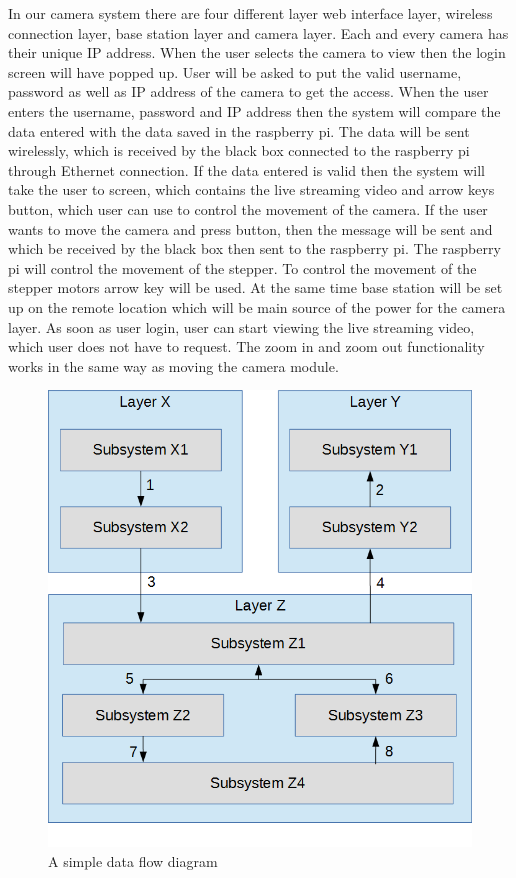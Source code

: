 In our camera system there are four different layer web interface layer, wireless connection layer, base station layer and camera layer. Each and every camera has their unique IP address. When the user selects the camera to view then the login screen will have popped up. User will be asked to put the valid username, password as well as IP address of the camera to get the access. When the user enters the username, password and IP address then the system will compare the data entered with the data saved in the raspberry pi. The data will be sent wirelessly, which is received by the black box connected to the raspberry pi through Ethernet connection. If the data entered is valid then the system will take the user to screen, which contains the live streaming video and arrow keys button, which user can use to control the movement of the camera. If the user wants to move the camera and press button, then the message will be sent and which be received by the black box then sent to the raspberry pi. The raspberry pi will control the movement of the stepper. To control the movement of the stepper motors arrow key will be used. At the same time base station will be set up on the remote location which will be main source of the power for the camera layer. As soon as user login, user can start viewing the live streaming video, which user does not have to request. The zoom in and zoom out functionality works in the same way as moving the camera module.


\begin{figure}[h!]
	\centering
 	\includegraphics[width=\textwidth]{images/data_flow}
 \caption{A simple data flow diagram}
\end{figure}
